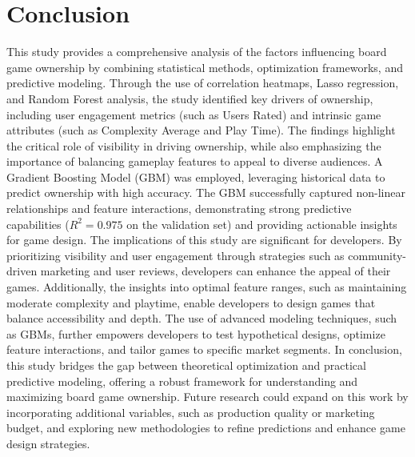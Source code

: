 \documentclass{article}
\begin{document}
\section{Conclusion}
This study provides a comprehensive analysis of the factors influencing board game ownership by combining statistical methods, optimization frameworks, and predictive modeling. Through the use of correlation heatmaps, Lasso regression, and Random Forest analysis, the study identified key drivers of ownership, including user engagement metrics (such as Users Rated) and intrinsic game attributes (such as Complexity Average and Play Time). The findings highlight the critical role of visibility in driving ownership, while also emphasizing the importance of balancing gameplay features to appeal to diverse audiences. A Gradient Boosting Model (GBM) was employed, leveraging historical data to predict ownership with high accuracy. The GBM successfully captured non-linear relationships and feature interactions, demonstrating strong predictive capabilities (\(R^2 = 0.975\) on the validation set) and providing actionable insights for game design. The implications of this study are significant for developers. By prioritizing visibility and user engagement through strategies such as community-driven marketing and user reviews, developers can enhance the appeal of their games. Additionally, the insights into optimal feature ranges, such as maintaining moderate complexity and playtime, enable developers to design games that balance accessibility and depth. The use of advanced modeling techniques, such as GBMs, further empowers developers to test hypothetical designs, optimize feature interactions, and tailor games to specific market segments. In conclusion, this study bridges the gap between theoretical optimization and practical predictive modeling, offering a robust framework for understanding and maximizing board game ownership. Future research could expand on this work by incorporating additional variables, such as production quality or marketing budget, and exploring new methodologies to refine predictions and enhance game design strategies.
\end{document}
